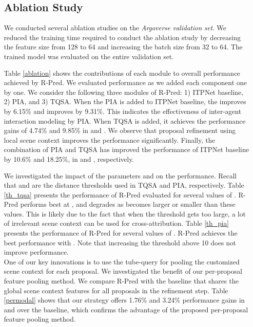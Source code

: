 \documentclass[10pt,twocolumn,letterpaper]{article}
\begin{document}
\subsection{Ablation Study}
We conducted several ablation studies on the {\it Argoverse validation set}. We reduced the training time required to conduct the ablation study by decreasing the feature size from 128 to 64 and increasing the batch size from 32 to 64. The trained model was evaluated on the entire validation set.
 
 Table \ref{ablation} shows the contributions of each module to overall performance achieved by R-Pred. We evaluated performance as we added each component one by one. We consider the following three modules of R-Pred: 1) ITPNet baseline, 2) PIA, and 3) TQSA. When the PIA is added to ITPNet baseline, the  improves by 6.15\% and  improves by 9.31\%. This indicates the effectiveness of  inter-agent interaction modeling by PIA.
When TQSA is added, it achieves the performance gains of 4.74\% and  9.85\% in  and . We observe that proposal refinement using local scene context improves the performance significantly.  Finally, the combination of PIA and TQSA has improved the performance of ITPNet baseline by 10.6\% and 18.25\%, in  and , respectively.

 We investigated the impact of the parameters    and  on the performance. Recall that  and  are the distance thresholds used in TQSA and PIA, respectively.  Table \ref{th_tqsa} presents the performance of R-Pred evaluated for several values of .   R-Pred performs best at , and degrades as  becomes larger or smaller than these values. This is likely due to the fact that when the threshold gets too large, a lot of irrelevant scene context can be used for cross-attribution.
Table \ref{th_pia} presents the performance of R-Pred for several values of .  R-Pred achieves the best performance with . Note that increasing the threshold  above 10 does not improve performance. \\
 One of our key innovations is to use the tube-query for pooling the customized scene context for each proposal. We investigated the benefit of our per-proposal feature pooling method. We compare R-Pred with the baseline that shares the global scene context features for all proposals in the refinement step. 
Table \ref{permodal} shows that our strategy offers 1.76\% and 3.24\% performance gains in  and  over the baseline, which confirms the advantage of the proposed per-proposal feature pooling method.
\end{document}

